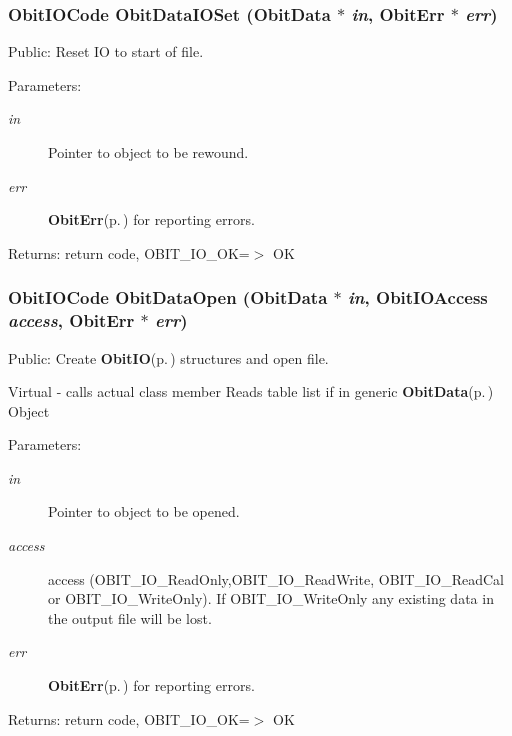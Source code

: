 \subsubsection{\setlength{\rightskip}{0pt plus 5cm}Obit\-IOCode Obit\-Data\-IOSet ({\bf Obit\-Data} $\ast$ {\em in}, {\bf Obit\-Err} $\ast$ {\em err})}\label{ObitData_8h_a40}


Public: Reset IO to start of file. 

\begin{Desc}
\item[Parameters:]
\begin{description}
\item[{\em in}]Pointer to object to be rewound. \item[{\em err}]{\bf Obit\-Err}{\rm (p.\,\pageref{structObitErr})} for reporting errors. \end{description}
\end{Desc}
\begin{Desc}
\item[Returns:]return code, OBIT\_\-IO\_\-OK=$>$ OK \end{Desc}
\subsubsection{\setlength{\rightskip}{0pt plus 5cm}Obit\-IOCode Obit\-Data\-Open ({\bf Obit\-Data} $\ast$ {\em in}, Obit\-IOAccess {\em access}, {\bf Obit\-Err} $\ast$ {\em err})}\label{ObitData_8h_a38}


Public: Create {\bf Obit\-IO}{\rm (p.\,\pageref{structObitIO})} structures and open file. 

Virtual - calls actual class member Reads table list if in generic {\bf Obit\-Data}{\rm (p.\,\pageref{structObitData})} Object \begin{Desc}
\item[Parameters:]
\begin{description}
\item[{\em in}]Pointer to object to be opened. \item[{\em access}]access (OBIT\_\-IO\_\-Read\-Only,OBIT\_\-IO\_\-Read\-Write, OBIT\_\-IO\_\-Read\-Cal or OBIT\_\-IO\_\-Write\-Only). If OBIT\_\-IO\_\-Write\-Only any existing data in the output file will be lost. \item[{\em err}]{\bf Obit\-Err}{\rm (p.\,\pageref{structObitErr})} for reporting errors. \end{description}
\end{Desc}
\begin{Desc}
\item[Returns:]return code, OBIT\_\-IO\_\-OK=$>$ OK \end{Desc}
